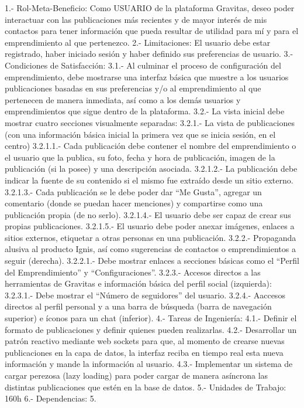 	1.-	Rol-Meta-Beneficio: Como USUARIO de la plataforma Gravitas, deseo poder interactuar con las publicaciones más recientes y de mayor interés de mis contactos para tener información que pueda resultar de utilidad para mí y para el emprendimiento al que pertenezco.
	2.-	Limitaciones: El usuario debe estar registrado, haber iniciado sesión y haber definido sus preferencias de usuario.
	3.-	Condiciones de Satisfacción:
		3.1.-	 Al culminar el proceso de configuración del emprendimiento, debe mostrarse una interfaz básica que muestre a los usuarios publicaciones basadas en sus preferencias y/o al emprendimiento al que pertenecen de manera inmediata, así como a los demás usuarios y emprendimientos que sigue dentro de la plataforma.
		3.2.-	La vista inicial debe mostrar cuatro secciones visualmente separadas:
			3.2.1.- La vista de publicaciones (con una información básica inicial la primera vez que se inicia sesión, en el centro)
				3.2.1.1.-	Cada publicación debe contener el nombre del emprendimiento o el usuario que la publica, su foto, fecha y hora de publicación, imagen de la publicación (si la posee) y una descripción asociada.
				3.2.1.2.-	La publicación debe indicar la fuente de su contenido si el mismo fue extraído desde un sitio externo.
				3.2.1.3.-	Cada publicación se le debe poder dar “Me Gusta”,  agregar un comentario (donde se puedan hacer menciones) y compartirse como una publicación propia (de no serlo).
				3.2.1.4.-	El usuario debe ser capaz de crear sus propias publicaciones.
				3.2.1.5.-	El usuario debe poder anexar imágenes, enlaces a sitios externos, etiquetar a otras personas en una publicación.
			3.2.2.-	Propaganda alusiva al producto Ignis, así como sugerencias de contactos o emprendimientos a seguir (derecha).
				3.2.2.1.- Debe mostrar enlaces a secciones básicas como el “Perfil del Emprendimiento” y “Configuraciones”.
			3.2.3.-	Accesos directos a las herramientas de Gravitas e información básica del perfil social (izquierda):
				3.2.3.1.- Debe mostrar el “Número de seguidores” del usuario.
			3.2.4.-	Aaccesos directos al perfil personal y a una barra de búsqueda (barra de navegación superior) e íconos para un chat (inferior).
	4.-	Tareas de Ingeniería:
		4.1.-	Definir el formato de publicaciones y definir quienes pueden realizarlas.
		4.2.- Desarrollar un patrón reactivo mediante web sockets para que, al momento de crearse nuevas publicaciones en la capa de datos, la interfaz reciba en tiempo real esta nueva información y mande la información al usuario.
		4.3.- Implementar un sistema de cargar perezosa (lazy loading) para poder cargar de manera asíncrona las distintas publicaciones que estén en la base de datos.
	5.-	Unidades de Trabajo: 160h
	6.-	Dependencias: 5.


















